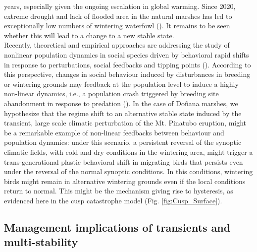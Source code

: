 \documentclass[12pt]{article}
\begin{document}
years, especially given the ongoing escalation in global warming. Since 2020, extreme drought and lack of flooded area in the natural marshes has led to exceptionally low numbers of wintering waterfowl (\cite{Camacho2022,Fox2023}). It remains to be seen whether this will lead to a change to a new stable state.\\

Recently, theoretical and empirical approaches are addressing the study of nonlinear population dynamics in social species driven by behavioral rapid shifts in response to perturbations, social feedbacks and tipping points (\cite{Oro2020a,Oro2023}). According to this perspective, changes in social behaviour induced by disturbances in breeding or wintering grounds may feedback at the population level to induce a highly non-linear dynamics, i.e., a population crash triggered by breeding site abandonment in response to predation (\cite{Almaraz2011,Oro2023}). In the case of Doñana marshes, we hypothesize that the regime shift to an alternative stable state induced by the transient, large scale climatic perturbation of the Mt. Pinatubo eruption, might be a remarkable example of non-linear feedbacks between behaviour and population dynamics: under this scenario, a persistent reversal of the synoptic climatic fields, with cold and dry conditions in the wintering area, might trigger a trans-generational plastic behavioral shift in migrating birds that persists even under the reversal of the normal synoptic conditions. In this conditions, wintering birds might remain in alternative wintering grounds even if the local conditions return to normal. This might be the mechanism giving rise to hysteresis, as evidenced here in the cusp catastrophe model (Fig. \ref{fig:Cusp_Surface}).\\

\subsection*{Management implications of transients and multi-stability}
\label{sec:Management implications of transients and multi-stability}
\end{document}
